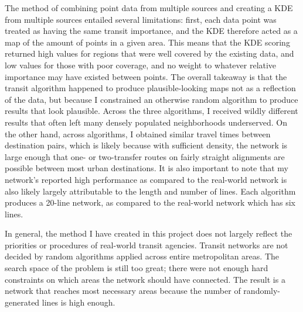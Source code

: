 \documentclass[sigconf,nonacm]{acmart}
\begin{document}
The method of combining point data from multiple sources and creating a KDE from multiple sources entailed several limitations: first, each data point was treated as having the same transit importance, and the KDE therefore acted as a map of the amount of points in a given area. This means that the KDE scoring returned high values for regions that were well covered by the existing data, and low values for those with poor coverage, and no weight to whatever relative importance may have existed between points. The overall takeaway is that the transit algorithm happened to produce plausible-looking maps not as a reflection of the data, but because I constrained an otherwise random algorithm to produce results that look plausible. Across the three algorithms, I received wildly different results that often left many densely populated neighborhoods underserved. On the other hand, across algorithms, I obtained similar travel times between destination pairs, which is likely because with sufficient density, the network is large enough that one- or two-transfer routes on fairly straight alignments are possible between most urban destinations. It is also important to note that my network's reported high performance as compared to the real-world network is also likely largely attributable to the length and number of lines. Each algorithm produces a 20-line network, as compared to the real-world network which has six lines. 

In general, the method I have created in this project does not largely reflect the priorities or procedures of real-world transit agencies. Transit networks are not decided by random algorithms applied across entire metropolitan areas. The search space of the problem is still too great; there were not enough hard constraints on which areas the network should have connected. The result is a network that reaches most necessary areas because the number of randomly-generated lines is high enough. 
\end{document}

